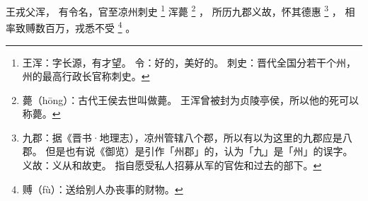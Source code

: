 
\switchcolumn*[\section{}]

王戎父浑，
有令名，官至凉州刺史%
\footnote{%
    王浑：字长源，有才望。
    令：好的，美好的。
    刺史：晋代全国分若干个州，州的最高行政长官称刺史。
}%
浑薨%
\footnote{%
    薨（hōng）：古代王侯去世叫做薨。
                王浑曾被封为贞陵亭侯，所以他的死可以称薨。
}%
，
所历九郡义故，怀其德惠%
\footnote{%
    九郡：据《晋书·地理志），凉州管辖八个郡，所以有以为这里的九郡应是八郡。
          但是也有说《御览）是引作「州郡」的，认为「九」是「州」的误字。
    义故：义从和故吏。
          指自愿受私人招募从军的官佐和过去的部下。
}%
，
相率致赙数百万，戎悉不受%
\footnote{%
    赙（fù）：送给别人办丧事的财物。
}%
。

\switchcolumn


